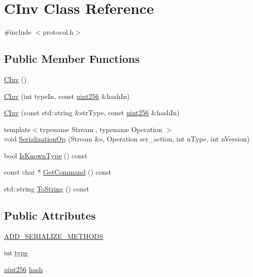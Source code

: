 \hypertarget{class_c_inv}{}\section{C\+Inv Class Reference}
\label{class_c_inv}


{\ttfamily \#include $<$protocol.\+h$>$}

\subsection*{Public Member Functions}
\begin{DoxyCompactItemize}
\item 
\hyperlink{class_c_inv_a831d208e5e1b142e36a89999b81c2298}{C\+Inv} ()
\item 
\hyperlink{class_c_inv_a4c6e02df7b10378f876ecc76c6b50301}{C\+Inv} (int type\+In, const \hyperlink{classuint256}{uint256} \&hash\+In)
\item 
\hyperlink{class_c_inv_a412cb8fdd0bfe185f770fec91a3e13c4}{C\+Inv} (const std\+::string \&str\+Type, const \hyperlink{classuint256}{uint256} \&hash\+In)
\item 
{\footnotesize template$<$typename Stream , typename Operation $>$ }\\void \hyperlink{class_c_inv_a7f56c1696e6c5c7ca36c1637f94dd1a0}{Serialization\+Op} (Stream \&s, Operation ser\+\_\+action, int n\+Type, int n\+Version)
\item 
bool \hyperlink{class_c_inv_a9259d1e8d828c6b6ea729d36d16cd84f}{Is\+Known\+Type} () const 
\item 
const char $\ast$ \hyperlink{class_c_inv_a393dc4726f105b25090a6ee4952e71b5}{Get\+Command} () const 
\item 
std\+::string \hyperlink{class_c_inv_a87a826a842d549c2747ced0c1a90bc18}{To\+String} () const 
\end{DoxyCompactItemize}
\subsection*{Public Attributes}
\begin{DoxyCompactItemize}
\item 
\hyperlink{class_c_inv_a3dc91b40ff6fe8c2c8879c81de67e209}{A\+D\+D\+\_\+\+S\+E\+R\+I\+A\+L\+I\+Z\+E\+\_\+\+M\+E\+T\+H\+O\+D\+S}
\item 
int \hyperlink{class_c_inv_a2da8a26c6b8824011e3144459d278c75}{type}
\item 
\hyperlink{classuint256}{uint256} \hyperlink{class_c_inv_abfa04c38e9c0def9a2b09a9c43929744}{hash}
\end{DoxyCompactItemize}
